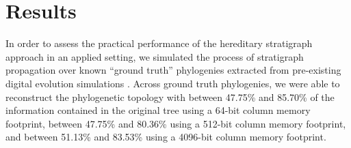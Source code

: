 \section{Results} \label{sec:results}

In order to assess the practical performance of the hereditary stratigraph approach in an applied setting, we simulated the process of stratigraph propagation over known ``ground truth'' phylogenies extracted from pre-existing digital evolution simulations \citep{hernandez2022phylogenetic}.
Across ground truth phylogenies, we were able to reconstruct the phylogenetic topology with between 47.75\% and 85.70\% of the information contained in the original tree using a 64-bit column memory footprint, between 47.75\% and 80.36\% using a 512-bit column memory footprint, and between 51.13\% and 83.53\% using a 4096-bit column memory footprint.
